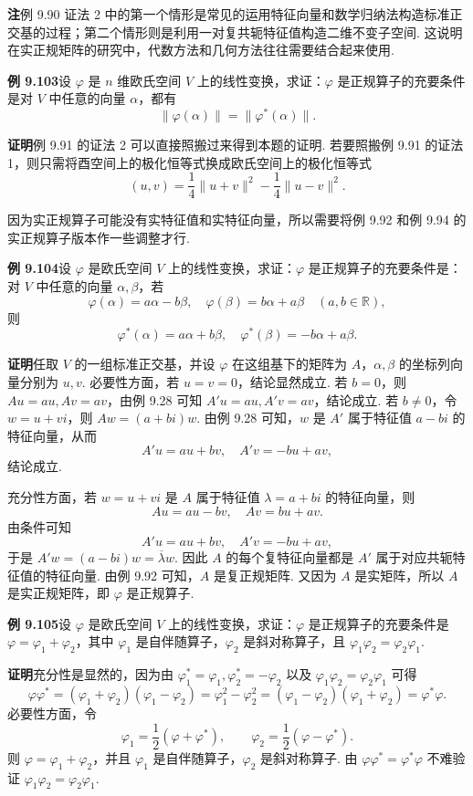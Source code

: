 \documentclass[UTF8,12pt,a4paper,fontset=fandol]{ctexart}
\begin{document}
\noindent\textbf{注}\quad 例 9.90 证法 2 中的第一个情形是常见的运用特征向量和数学归纳法构造标准正交基的过程；第二个情形则是利用一对复共轭特征值构造二维不变子空间. 这说明在实正规矩阵的研究中，代数方法和几何方法往往需要结合起来使用.

\noindent\textbf{例 9.103}\quad 设 $\varphi$ 是 $n$ 维欧氏空间 $V$ 上的线性变换，求证：$\varphi$ 是正规算子的充要条件是对 $V$ 中任意的向量 $\alpha$，都有
\[
\|\varphi(\alpha)\|=\|\varphi^*(\alpha)\|.
\]

\noindent\textbf{证明}\quad 例 9.91 的证法 2 可以直接照搬过来得到本题的证明. 若要照搬例 9.91 的证法 1，则只需将酉空间上的极化恒等式换成欧氏空间上的极化恒等式
\[
(u,v)=\frac{1}{4}\|u+v\|^2-\frac{1}{4}\|u-v\|^2.
\]

因为实正规算子可能没有实特征值和实特征向量，所以需要将例 9.92 和例 9.94 的实正规算子版本作一些调整才行.

\noindent\textbf{例 9.104}\quad 设 $\varphi$ 是欧氏空间 $V$ 上的线性变换，求证：$\varphi$ 是正规算子的充要条件是：对 $V$ 中任意的向量 $\alpha,\beta$，若
\[
\varphi(\alpha)=a\alpha-b\beta,\quad \varphi(\beta)=b\alpha+a\beta\quad (a,b\in\mathbb{R}),
\]
则
\[
\varphi^*(\alpha)=a\alpha+b\beta,\quad \varphi^*(\beta)=-b\alpha+a\beta.
\]

\noindent\textbf{证明}\quad 任取 $V$ 的一组标准正交基，并设 $\varphi$ 在这组基下的矩阵为 $A$，$\alpha,\beta$ 的坐标列向量分别为 $u,v$. 必要性方面，若 $u=v=0$，结论显然成立. 若 $b=0$，则 $Au=au,Av=av$，由例 9.28 可知 $A'u=au,A'v=av$，结论成立. 若 $b\ne0$，令 $w=u+vi$，则 $Aw=(a+bi)w$. 由例 9.28 可知，$w$ 是 $A'$ 属于特征值 $a-bi$ 的特征向量，从而
\[
A'u=a u+b v,\quad A'v=-b u+a v,
\]
结论成立.

充分性方面，若 $w=u+vi$ 是 $A$ 属于特征值 $\lambda=a+bi$ 的特征向量，则
\[
Au=au-bv,\quad Av=bu+av.
\]
由条件可知
\[
A'u=au+bv,\quad A'v=-bu+av,
\]
于是 $A'w=(a-bi)w=\overline{\lambda}w$. 因此 $A$ 的每个复特征向量都是 $A'$ 属于对应共轭特征值的特征向量. 由例 9.92 可知，$A$ 是复正规矩阵. 又因为 $A$ 是实矩阵，所以 $A$ 是实正规矩阵，即 $\varphi$ 是正规算子.

\noindent\textbf{例 9.105}\quad 设 $\varphi$ 是欧氏空间 $V$ 上的线性变换，求证：$\varphi$ 是正规算子的充要条件是 $\varphi=\varphi_1+\varphi_2$，其中 $\varphi_1$ 是自伴随算子，$\varphi_2$ 是斜对称算子，且 $\varphi_1\varphi_2=\varphi_2\varphi_1$.

\noindent\textbf{证明}\quad 充分性是显然的，因为由 $\varphi_1^*=\varphi_1,\varphi_2^*=-\varphi_2$ 以及 $\varphi_1\varphi_2=\varphi_2\varphi_1$ 可得
\[
\varphi\varphi^*=(\varphi_1+\varphi_2)(\varphi_1-\varphi_2)=\varphi_1^2-\varphi_2^2=(\varphi_1-\varphi_2)(\varphi_1+\varphi_2)=\varphi^*\varphi.
\]
必要性方面，令
\[
\varphi_1=\frac{1}{2}(\varphi+\varphi^*),\qquad \varphi_2=\frac{1}{2}(\varphi-\varphi^*).
\]
则 $\varphi=\varphi_1+\varphi_2$，并且 $\varphi_1$ 是自伴随算子，$\varphi_2$ 是斜对称算子. 由 $\varphi\varphi^*=\varphi^*\varphi$ 不难验证 $\varphi_1\varphi_2=\varphi_2\varphi_1$.
\end{document}
